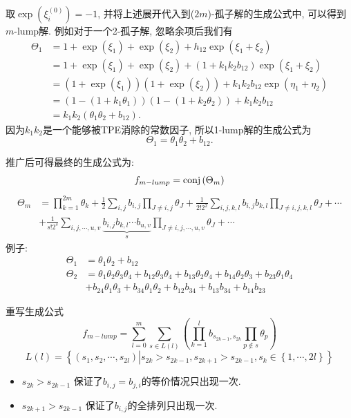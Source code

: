 \documentclass{beamer}
\newcommand{\sbrace}[1]{\left(#1\right)}
\newcommand{\bbrace}[1]{\left\{#1\right\}}
\newcommand{\conj}[1]{{\rm conj}\sbrace{#1}}
\begin{document}
\begin{frame}
取$\exp\sbrace{\xi_i^{(0)}}=-1$, 并将上述展开代入到($2m$)-孤子解的生成公式中, 可以得到$m$-lump解. 例如对于一个2-孤子解, 忽略余项后我们有
\begin{equation*}
\begin{split}
\Theta_1&=1+\exp(\xi_1)+\exp(\xi_2)+h_{12}\exp(\xi_1+\xi_2) \\ 
&= 1+\exp(\xi_1)+\exp(\xi_2)+(1+k_1k_2b_{12})\exp(\xi_1+\xi_2) \\ 
&=(1+\exp(\xi_1))(1+\exp(\xi_2))+k_1k_2b_{12}\exp(\eta_1+\eta_2) \\ 
&=(1-(1+k_1\theta_1))(1-(1+k_2\theta_2))+k_1k_2b_{12} \\
&=k_1k_2(\theta_1\theta_2+b_{12}).
\end{split}
\end{equation*}
因为$k_1k_2$是一个能够被TPE消除的常数因子, 所以1-lump解的生成公式为
\begin{equation*}
    \Theta_1=\theta_1\theta_2+b_{12}.
\end{equation*}
\end{frame}
\begin{frame}
推广后可得最终的生成公式为:
\[
    f_{m-lump}=\conj{\Theta_m}
\]
\[
\begin{split}
    \Theta_m&=\prod_{k=1}^{2m}\theta_k+\frac{1}{2}\sum_{i,j}{b_{i,j}}\prod_{J\neq i,j}{\theta_J}+\frac{1}{2! 2^2}\sum_{i,j,k,l}{b_{i,j}b_{k,l}}\prod_{J\neq i,j,k,l}{\theta_{J}}+\cdots \\
    &+\frac{1}{s!2^s}\sum_{i,j,\cdots,u,v}\underbrace{{b_{i,j}b_{k,l}\cdots b_{u,v}}}_{s}\prod_{J\neq i,j,\cdots, u,v}{\theta_J}+\cdots 
\end{split}
\]
例子:
\[
\begin{split}
\Theta_1&=\theta_{1}\theta_{2}+b_{12} \\
\Theta_2&=\theta_{1}\theta_{2}\theta_{3}\theta_{4}+b_{12}\theta_{3}\theta_{4}+b_{13}\theta_{2}\theta_{4}+b_{14}\theta_{2}\theta_{3}+b_{23}\theta_{1}\theta_{4}\\
&+b_{24}\theta_{1}\theta_{3}+b_{34}\theta_{1}\theta_{2}+b_{12}b_{34}+b_{13}b_{34}+b_{14}b_{23}
\end{split}
\]
\end{frame}

\begin{frame}
重写生成公式
\[
    f_{m-lump}=\sum_{l=0}^m\sum_{s\in L(l)}\sbrace{\prod_{k=1}^l{b_{s_{2k-1},s_{2k}}}\prod_{p\not\in s}{\theta_p}}
\]
\[
    L(l)=\bbrace{\sbrace{s_1, s_2, \cdots ,s_{2l}}\left|s_{2k}>s_{2k-1},s_{2k+1}>s_{2k-1},s_k\in \bbrace{1,\cdots,2l}\right.}
\]
\begin{itemize}
\item $s_{2k}>s_{2k-1}$ 保证了$b_{i,j}=b_{j,i}$的等价情况只出现一次. 
\item $s_{2k+1}>s_{2k-1}$ 保证了$b_{i,j}$的全排列只出现一次.
\end{itemize}
\end{frame}
\end{document}
